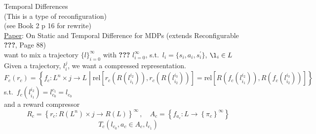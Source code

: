 Temporal Differences\\
(This is a type of reconfiguration)\\

(see Book 2 p 16 for rewrite)\\

\underline{Paper}: On Static and Temporal Difference for MDPs (extends Reconfigurable \textbf{???}, Page 88)\\

want to mix a trajectory $\{ l \}_{i=0}^{\infty}$ with \textbf{???} $l_{i=0}^{\infty}$, s.t.\ $l_i=\{ s_i, a_i, s^\prime_i \}$, $\l_i \in L$ \\

Given a trajectory, $l_i^j$, we want a compressed representation.\\

\begin{equation*}
F_c ( r_c ) = \left\{ 
f_c: L^n \times j \to L
\middle| 
\textrm{rel}\left[ r_c\left( R(  l_{i_1}^{i_2} ) \right), r_c\left( R( l_{i_2}^{i_3} ) \right) \right]
=
\textrm{rel}\left[ R\left( f_c( l_{i_1}^{i_2} ) \right), R\left( f_c( l_{i_2}^{i_3} ) \right) \right]
\right\}
\end{equation*}
s.t.\ $f_c( l_{i_1}^{i_2} ) = l_{c_0}^{c_1}=l_{c_0}$\\

and a reward compressor
\begin{equation*}
R_c = \left\{ r_c: R(L^n)\times j \to R(L)\right\}^{\infty}\,,\quad A_c= \left\{ f_{a_c}: L \to \left\{ \pi_c \right\}^{\infty} \right\}
\end{equation*}
\begin{equation*}
T_c(l_{c_0}, a_c \in A_c, l_{c_1})
\end{equation*}